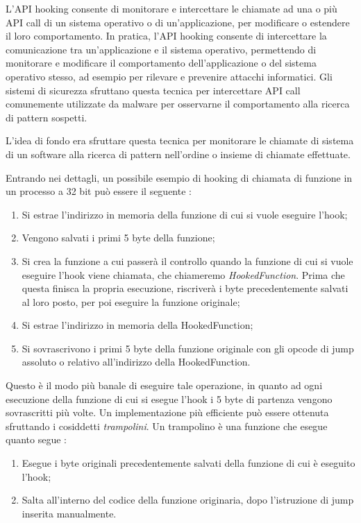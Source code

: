 L'API hooking  consente di monitorare e intercettare le chiamate ad una o più API call di un sistema operativo o di un'applicazione, per modificare o estendere il loro comportamento. In pratica, l'API hooking consente di intercettare la comunicazione tra un'applicazione e il sistema operativo, permettendo di monitorare e modificare il comportamento dell'applicazione o del sistema operativo stesso, ad esempio per rilevare e prevenire attacchi informatici. Gli sistemi di sicurezza sfruttano questa tecnica per intercettare API call comunemente utilizzate da malware per osservarne il comportamento alla ricerca di pattern sospetti.

L'idea di fondo era sfruttare questa tecnica per monitorare le chiamate di sistema di un software alla ricerca di pattern nell'ordine o insieme di chiamate effettuate. 


Entrando nei dettagli, un possibile  esempio di hooking di chiamata di  funzione in un processo a 32 bit può essere il seguente \cite{hooking1,hooking2}:
\begin{enumerate}
    \item Si estrae l'indirizzo in memoria della funzione di cui si vuole eseguire l'hook;
    \item Vengono salvati i primi 5 byte  della funzione;
    \item Si crea la funzione a cui passerà il controllo quando la funzione di cui si vuole eseguire l'hook viene chiamata, che chiameremo \textit{HookedFunction}. Prima che questa finisca la propria esecuzione, riscriverà i byte  precedentemente salvati al loro posto, per poi eseguire la funzione originale;
    \item Si estrae l'indirizzo in memoria della HookedFunction;
    \item Si sovrascrivono i primi 5 byte della funzione originale con gli opcode di jump assoluto o relativo all'indirizzo della HookedFunction.
\end{enumerate}

Questo è il modo più banale di eseguire tale operazione, in quanto ad ogni esecuzione della funzione di cui si esegue l'hook i 5 byte di partenza vengono sovrascritti più volte. Un implementazione più efficiente può essere ottenuta sfruttando i cosiddetti \textit{trampolini}. Un trampolino è una funzione che esegue quanto segue \cite{hooking2}:
\begin{enumerate}
    \item Esegue i byte originali precedentemente salvati della funzione di cui è eseguito l'hook;
    \item Salta all'interno del codice della funzione originaria, dopo l'istruzione di jump inserita manualmente.
\end{enumerate}

